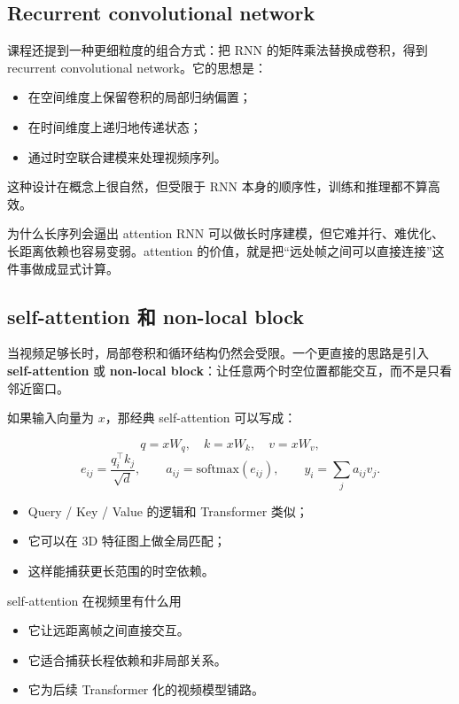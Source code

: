 \documentclass[a4paper]{article}
\begin{document}
\subsection{Recurrent convolutional network}

课程还提到一种更细粒度的组合方式：把 RNN 的矩阵乘法替换成卷积，得到 recurrent convolutional network。它的思想是：

\begin{itemize}
    \item 在空间维度上保留卷积的局部归纳偏置；
    \item 在时间维度上递归地传递状态；
    \item 通过时空联合建模来处理视频序列。
\end{itemize}

这种设计在概念上很自然，但受限于 RNN 本身的顺序性，训练和推理都不算高效。

\begin{importantbox}{为什么长序列会逼出 attention}
RNN 可以做长时序建模，但它难并行、难优化、长距离依赖也容易变弱。attention 的价值，就是把“远处帧之间可以直接连接”这件事做成显式计算。
\end{importantbox}

\subsection{self-attention 和 non-local block}

当视频足够长时，局部卷积和循环结构仍然会受限。一个更直接的思路是引入 \textbf{self-attention} 或 \textbf{non-local block}：让任意两个时空位置都能交互，而不是只看邻近窗口。

如果输入向量为 $x$，那经典 self-attention 可以写成：

\[
q = xW_q,\quad k = xW_k,\quad v = xW_v,
\]
\[
e_{ij} = \frac{q_i^\top k_j}{\sqrt{d}}, \qquad a_{ij} = \mathrm{softmax}(e_{ij}), \qquad y_i = \sum_j a_{ij} v_j.
\]

\begin{itemize}
    \item Query / Key / Value 的逻辑和 Transformer 类似；
    \item 它可以在 3D 特征图上做全局匹配；
    \item 这样能捕获更长范围的时空依赖。
\end{itemize}

\begin{knowledgebox}{self-attention 在视频里有什么用}
\begin{itemize}
    \item 它让远距离帧之间直接交互。
    \item 它适合捕获长程依赖和非局部关系。
    \item 它为后续 Transformer 化的视频模型铺路。
\end{itemize}
\end{knowledgebox}
\end{document}
